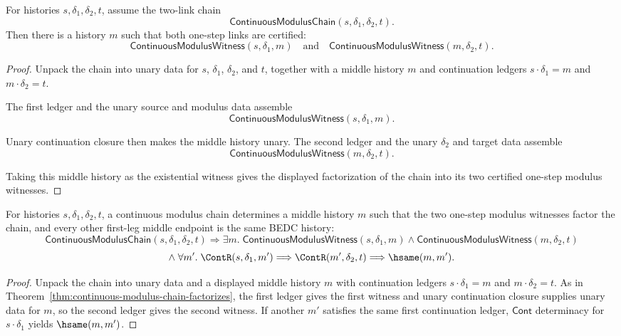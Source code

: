 \begin{theorem}
\label{thm:continuous-modulus-chain-factorizes}
For histories $s,\delta_1,\delta_2,t$, assume the two-link chain
$$
\mathsf{ContinuousModulusChain}(s,\delta_1,\delta_2,t).
$$
Then there is a history $m$ such that both one-step links are certified:
$$
\mathsf{ContinuousModulusWitness}(s,\delta_1,m)
\quad\text{and}\quad
\mathsf{ContinuousModulusWitness}(m,\delta_2,t).
$$
\end{theorem}
\begin{proof}
Unpack the chain into unary data for $s$, $\delta_1$, $\delta_2$, and $t$,
together with a middle history $m$ and continuation ledgers
$s\cdot\delta_1=m$ and $m\cdot\delta_2=t$.

The first ledger and the unary source and modulus data assemble
$$
\mathsf{ContinuousModulusWitness}(s,\delta_1,m).
$$

Unary continuation closure then makes the middle history unary. The second
ledger and the unary $\delta_2$ and target data assemble
$$
\mathsf{ContinuousModulusWitness}(m,\delta_2,t).
$$

Taking this middle history as the existential witness gives the displayed
factorization of the chain into its two certified one-step modulus witnesses.
\end{proof}

\begin{theorem}
\label{thm:continuous-modulus-chain-middle-deterministic-factorization}
For histories $s,\delta_1,\delta_2,t$, a continuous modulus chain determines a
middle history $m$ such that the two one-step modulus witnesses factor the
chain, and every other first-leg middle endpoint is the same BEDC history:
$$
\mathsf{ContinuousModulusChain}(s,\delta_1,\delta_2,t)
\Longrightarrow
\exists m.\;
\mathsf{ContinuousModulusWitness}(s,\delta_1,m)\land
\mathsf{ContinuousModulusWitness}(m,\delta_2,t)
$$
$$
\land\;
\forall m'.\;
\ContR(s,\delta_1,m')\Longrightarrow
\ContR(m',\delta_2,t)\Longrightarrow
\hsame(m,m').
$$
\end{theorem}
\begin{proof}
Unpack the chain into unary data and a displayed middle history $m$ with
continuation ledgers $s\cdot\delta_1=m$ and $m\cdot\delta_2=t$. As in
Theorem~\ref{thm:continuous-modulus-chain-factorizes}, the first ledger gives
the first witness and unary continuation closure supplies unary data for $m$,
so the second ledger gives the second witness. If another $m'$ satisfies the
same first continuation ledger, $\mathsf{Cont}$ determinacy for
$s\cdot\delta_1$ yields $\hsame(m,m')$.
\end{proof}

